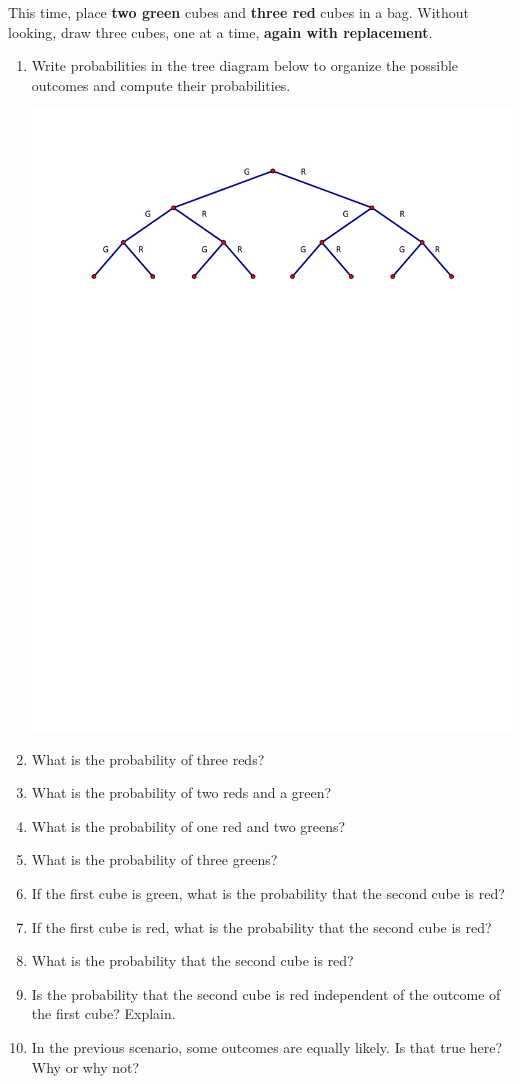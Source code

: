 \documentclass[nooutcomes]{ximera}
\begin{document}
\newpage
\begin{problem}
This time, place \textbf{two green} cubes and \textbf{three red} cubes in a bag.  Without looking, draw three cubes, one at a time, \textbf{again with replacement}.  
\begin{enumerate}
\item Write probabilities in the tree diagram below to organize the possible outcomes and compute their probabilities.  
\begin{image}
\includegraphics[scale=0.8]{graphics/Tree.pdf}
\end{image}
\vspace{.15in}
\item What is the probability of three reds? 
\item What is the probability of two reds and a green? 
\item What is the probability of one red and two greens? 
\item What is the probability of three greens? 
\item If the first cube is green, what is the probability that the second cube is red? 
\item If the first cube is red, what is the probability that the second cube is red? 
\item What is the probability that the second cube is red?  
\item Is the probability that the second cube is red independent of the outcome of the first cube?  Explain. 
\item In the previous scenario, some outcomes are equally likely.  Is that true here?  Why or why not? 
\end{enumerate}
\end{problem}
\end{document}
